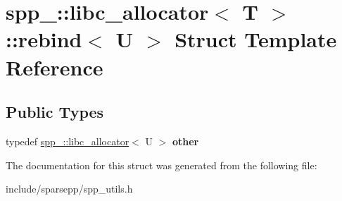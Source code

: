 \hypertarget{structspp___1_1libc__allocator_1_1rebind}{}\section{spp\+\_\+\+:\+:libc\+\_\+allocator$<$ T $>$\+:\+:rebind$<$ U $>$ Struct Template Reference}
\label{structspp___1_1libc__allocator_1_1rebind}
\subsection*{Public Types}
\begin{DoxyCompactItemize}
\item 
typedef \hyperlink{classspp___1_1libc__allocator}{spp\+\_\+\+::libc\+\_\+allocator}$<$ U $>$ {\bfseries other}\hypertarget{structspp___1_1libc__allocator_1_1rebind_a6b3b3b94a2ce602df624ef5b6fbe16ff}{}\label{structspp___1_1libc__allocator_1_1rebind_a6b3b3b94a2ce602df624ef5b6fbe16ff}

\end{DoxyCompactItemize}


The documentation for this struct was generated from the following file\+:\begin{DoxyCompactItemize}
\item 
include/sparsepp/spp\+\_\+utils.\+h\end{DoxyCompactItemize}
